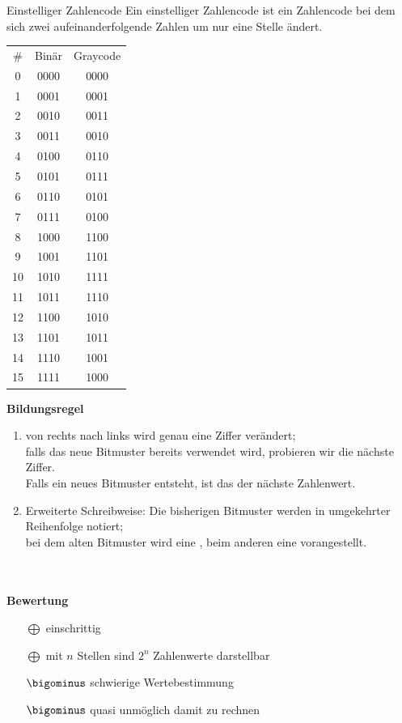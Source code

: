 \documentclass[10pt,a4paper]{scrartcl}
\begin{document}
\begin{Theorem}{Einstelliger Zahlencode}{}
	Ein einstelliger Zahlencode ist ein Zahlencode bei dem sich zwei aufeinanderfolgende Zahlen um nur eine Stelle ändert.
\end{Theorem}

\begin{minipage}{0.45\textwidth}
	\begin{tabular}{c|c|c}
		\# & Binär & Graycode\\
		0 & 0000 & 0000\\
		1 & 0001 & 0001\\
		2 & 0010 & 0011\\
		3 & 0011 & 0010\\
		4 & 0100 & 0110\\
		5 & 0101 & 0111\\
		6 & 0110 & 0101\\
		7 & 0111 & 0100\\
		8 & 1000 & 1100\\
		9 & 1001 & 1101\\
		10 & 1010 & 1111\\
		11 & 1011 & 1110\\
		12 & 1100 & 1010\\
		13 & 1101 & 1011\\
		14 & 1110 & 1001\\
		15 & 1111 & 1000\\
	\end{tabular}
\end{minipage}
\begin{minipage}{0.45\textwidth}
	\textbf{Bildungsregel}\\
	\begin{enumerate}
		\itemsep0em
		\vspace*{-2em}
		\item von rechts nach links wird genau eine Ziffer verändert; \\ falls das neue Bitmuster bereits verwendet wird, probieren wir die nächste Ziffer. \\ Falls ein neues Bitmuster entsteht, ist das der nächste Zahlenwert.
		\item Erweiterte Schreibweise: Die bisherigen Bitmuster werden in umgekehrter Reihenfolge notiert;\\
		bei dem alten Bitmuster wird eine \grqq, beim anderen eine \grqq{} vorangestellt.
	\end{enumerate}
\end{minipage}
\\\\
\textbf{Bewertung}\\
\begin{itemize}
	\itemsep0em
	\vspace*{-2em}
	\item[$\bigoplus$] einschrittig
	\item[$\bigoplus$] mit $ n $ Stellen sind $ 2^n $ Zahlenwerte darstellbar
	\item[$ \bigominus $] schwierige Wertebestimmung
	\item[$ \bigominus $] quasi unmöglich damit zu rechnen
\end{itemize}
\end{document}

